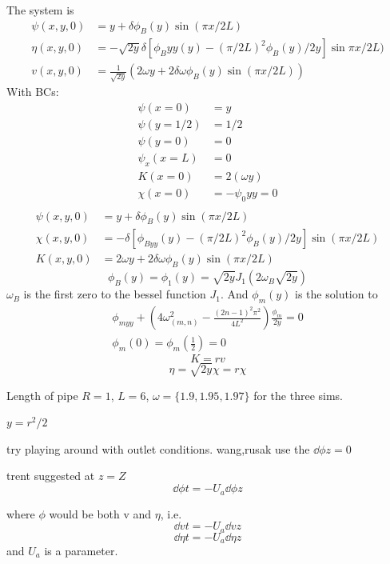 \documentclass{X:/Documents/Coding/Latex/myreport}
\begin{document}
The system is
\begin{align*}
    \psi(x,y,0) &= y + \delta \phi_B(y) \sin (\pi x / 2L)\\
    \eta(x,y,0) &= -\sqrt{2y} \delta \left[\phi_B{yy}(y) - (\pi/2L)^2 \phi_B(y)/2y\right]\sin \pi x/2L)\\
    v(x,y,0) &= \frac{1}{\sqrt{2y}} \left(2 \omega y + 2 \delta \omega \phi_B(y) \sin(\pi x/2L)\right)
\end{align*}
With BCs:
\begin{align*}
    \psi(x=0) &= y\\
    \psi(y=1/2) &= 1/2\\
    \psi(y=0) &= 0\\
    \psi_x(x=L) &= 0 \\
    K(x=0) &= 2(\omega y)\\
    \chi(x=0) &= - \psi_0{yy} = 0\\
\end{align*}
\begin{align*}
  \psi(x,y,0) &= y + \delta \phi_B(y) \sin(\pi x/2L)\\
  \chi(x,y,0) &= -\delta[\phi_{Byy}(y) -(\pi/2L)^2 \phi_B(y)/2y]\sin(\pi x/2L)\\
  K(x,y,0) &= 2 \omega y + 2  \delta \omega \phi_B(y) \sin (\pi x/2L)
\end{align*}
\[\phi_B(y) = \phi_1(y) = \sqrt{2y} J_1(2\omega_B \sqrt{2y})\]
$\omega_B$ is the first zero to the bessel function $J_1$.
And $\phi_{m}(y)$ is the solution to
\begin{align*}
    \phi_{myy} + \left(4 \omega^2_{(m,n)} - \frac{(2n -1)^2 \pi^2}{4L^2}\right) \frac{\phi_m}{2y} = 0\\
    \phi_m(0) = \phi_m(\frac12) = 0
\end{align*}
\[K = rv\]
\[\eta = \sqrt{2y} \chi = r \chi \]

Length of pipe $R=1$, $L=6$, $\omega = \{1.9,1.95,1.97\}$ for the three sims.

$y = r^2/2$

try playing around with outlet conditions. wang,rusak use the $\dd \phi z = 0$

trent suggested at $z=Z$
\[\dd \phi t = -U_{a} \dd \phi z\]

where $\phi$ would be both v and $\eta$, i.e.
\[\dd vt = - U_{a} \dd v z\]
\[\dd\eta t = - U_{a} \dd \eta z\]
and $U_a$ is a parameter.
\end{document}
